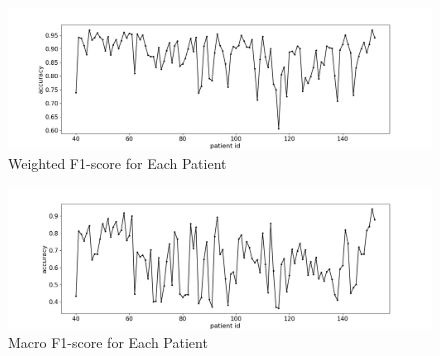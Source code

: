 \documentclass{article}
\begin{document}
\begin{figure}[H]
\centering
\includegraphics[width=\textwidth]{Weighted F1-score.png}
\caption{Weighted F1-score for Each Patient}
\label{tab:perfomance}
\end{figure}

\begin{figure}[H]
\centering
\includegraphics[width=\textwidth]{Macro F1-score.png}
\caption{Macro F1-score for Each Patient}
\label{tab:perfomance}
\end{figure}
    
\end{document}
